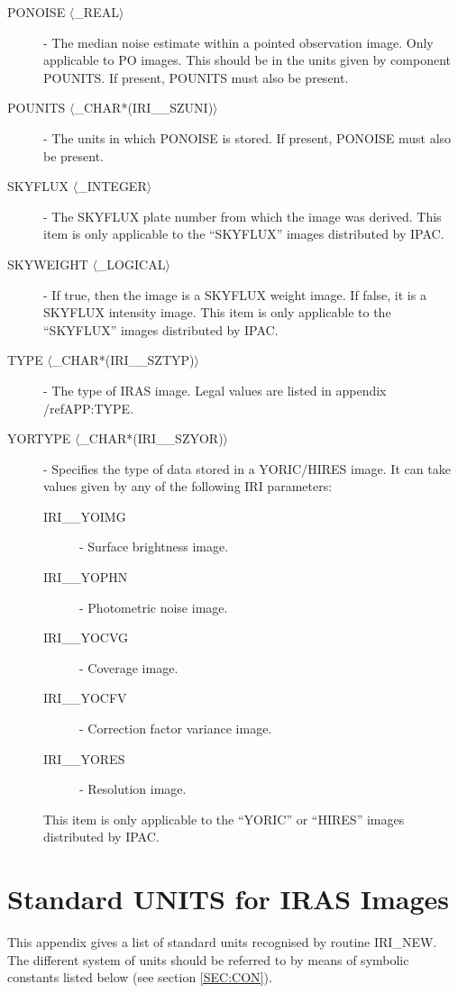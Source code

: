 \begin{description}
\item [PONOISE $\langle$\_REAL$\rangle$] - The median noise estimate within a
pointed observation image. Only applicable to PO images. This should be in the
units given by component POUNITS. If present, POUNITS must also be present.

\item [POUNITS $\langle$\_CHAR*(IRI\_\_SZUNI)$\rangle$] - The units in which
PONOISE is stored. If present, PONOISE must also be present.

\item [SKYFLUX $\langle$\_INTEGER$\rangle$] - The SKYFLUX plate number from which the
image was derived. This item is only applicable to the ``SKYFLUX'' images
distributed by IPAC.

\item [SKYWEIGHT $\langle$\_LOGICAL$\rangle$] - If true, then the image is a
SKYFLUX weight image. If false, it is a SKYFLUX intensity image. This item is
only applicable to the ``SKYFLUX'' images distributed by IPAC.

\item [TYPE $\langle$\_CHAR*(IRI\_\_SZTYP)$\rangle$] - The type of IRAS image.
Legal values are listed in appendix /ref{APP:TYPE}.

\item [YORTYPE $\langle$\_CHAR*(IRI\_\_SZYOR)$\rangle$] - Specifies the type of
data stored in a YORIC/HIRES image. It can take values given by any of the
following IRI parameters:
\begin{description}
\item [IRI\_\_YOIMG] - Surface brightness image.
\item [IRI\_\_YOPHN] - Photometric noise image.
\item [IRI\_\_YOCVG] - Coverage image.
\item [IRI\_\_YOCFV] - Correction factor variance image.
\item [IRI\_\_YORES] - Resolution image.
\end{description}
This item is only applicable to the ``YORIC'' or ``HIRES''  images distributed
by IPAC.

\end{description}

\section{Standard UNITS for IRAS Images}
\label{APP:UNITS}
This appendix gives a list of standard units recognised by routine IRI\_NEW.
The different system of units should be referred to by means of symbolic
constants listed below (see section \ref{SEC:CON}).

